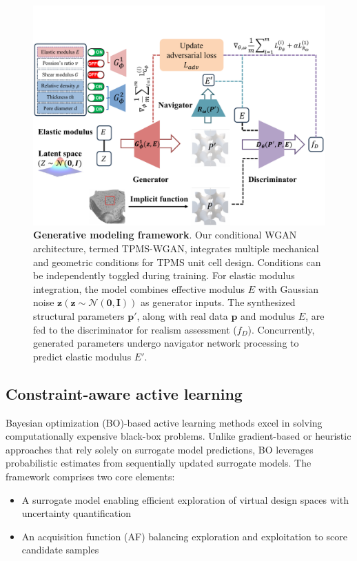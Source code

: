 \documentclass[preprint,review,12pt,authoryear]{elsarticle}
\begin{document}
\begin{figure}
    \centering
    \includegraphics[width=1\linewidth]{figures/3.pdf}        
    \caption{\textbf{Generative modeling framework}. Our conditional WGAN architecture, termed TPMS-WGAN, integrates multiple mechanical and geometric conditions for TPMS unit cell design. Conditions can be independently toggled during training. For elastic modulus integration, the model combines effective modulus $E$ with Gaussian noise $\boldsymbol{z} (\boldsymbol{z}\sim\mathcal{N}(\mathbf{0},\mathbf{I}))$ as generator inputs. The synthesized structural parameters $\boldsymbol{p}'$, along with real data $\boldsymbol{p}$ and modulus $E$, are fed to the discriminator for realism assessment ($f_D$). Concurrently, generated parameters undergo navigator network processing to predict elastic modulus $E'$.}
    \label{fig:2}
\end{figure}

\subsection{Constraint-aware active learning}
\label{sec:2-4}
Bayesian optimization (BO)-based active learning methods excel in solving computationally expensive black-box problems. Unlike gradient-based or heuristic approaches that rely solely on surrogate model predictions, BO leverages probabilistic estimates from sequentially updated surrogate models. The framework comprises two core elements:
\begin{itemize}
    \item A surrogate model enabling efficient exploration of virtual design spaces with uncertainty quantification
    \item An acquisition function (AF) balancing exploration and exploitation to score candidate samples
\end{itemize}
\end{document}
